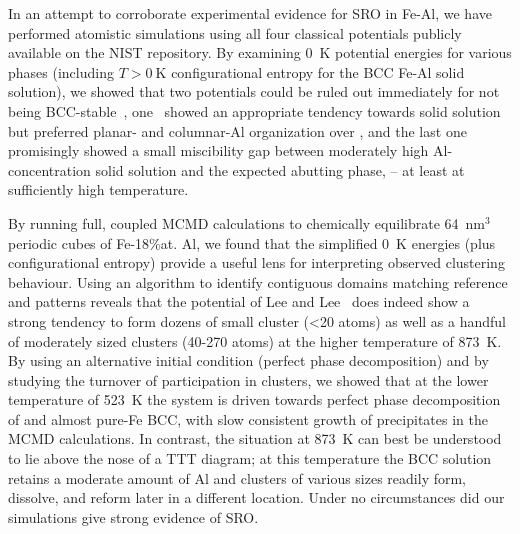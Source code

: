 In an attempt to corroborate experimental evidence for SRO in Fe-Al, we have performed atomistic simulations using all four classical potentials publicly available on the NIST repository.
By examining 0~K potential energies for various phases (including $T>0~\mathrm{K}$ configurational entropy for the BCC Fe-Al solid solution), we showed that two potentials could be ruled out immediately for not being BCC-stable~\cite{farkas2020model, jelinek2012modified}, one~\cite{mendelev2005effect} showed an appropriate tendency towards solid solution but preferred planar- and columnar-Al organization over \DOTHREE, and the last one~\cite{lee2010modified} promisingly showed a small miscibility gap between moderately high Al-concentration solid solution and the expected abutting phase, \DOTHREE -- at least at sufficiently high temperature.

By running full, coupled MCMD calculations to chemically equilibrate 64~$\mathrm{nm}^3$ periodic cubes of Fe-18\%at. Al, we found that the simplified 0~K energies (plus configurational entropy) provide a useful lens for interpreting observed clustering behaviour.
Using an algorithm to identify contiguous domains matching reference \DOTHREE and \BTWO patterns reveals that the potential of Lee and Lee~\cite{lee2010modified} does indeed show a strong tendency to form dozens of small cluster (<20 atoms) as well as a handful of moderately sized clusters (40-270 atoms) at the higher temperature of 873~K.
By using an alternative initial condition (perfect phase decomposition) and by studying the turnover of participation in \DOTHREE clusters, we showed that at the lower temperature of 523~K the system is driven towards perfect phase decomposition of \DOTHREE and almost pure-Fe BCC, with slow consistent growth of precipitates in the MCMD calculations.
In contrast, the situation at 873~K can best be understood to lie above the nose of a TTT diagram;
at this temperature the BCC solution retains a moderate amount of Al and clusters of various sizes readily form, dissolve, and reform later in a different location.
Under no circumstances did our simulations give strong evidence of \BTWO SRO.

